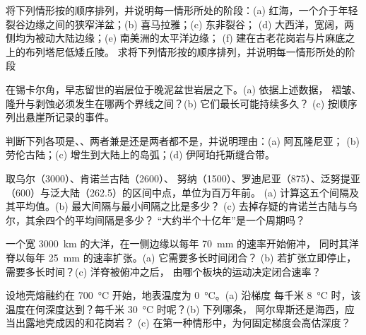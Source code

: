 \begin{exercise}[$\star$]\label{exo:b2:wilson-cycle:2}
将下列情形按的顺序排列，并说明每一情形所处的阶段：(a) 红海，一个介于年轻裂谷边缘之间的狭窄洋盆；(b) 喜马拉雅；(c) 东非裂谷；
(d) 大西洋，宽阔，两侧均为被动大陆边缘；(e) 南美洲的太平洋边缘；
(f) 建在古老花岗岩与片麻底之上的布列塔尼低矮丘陵。
求将下列情形按的顺序排列，并说明每一情形所处的阶段
\end{exercise}

\begin{exercise}[$\star$]\label{exo:b2:wilson-cycle:3}
在锡卡尔角，早志留世的岩层位于晚泥盆世岩层之下。(a) 依据上述数据，
褶皱、隆升与剥蚀必须发生在哪两个界线之间？(b) 它们最长可能持续多久？
(c) 按顺序列出悬崖所记录的事件。
\end{exercise}

\begin{exercise}[$\star$]\label{exo:b2:wilson-cycle:4}
判断下列各项是、、两者兼是还是两者都不是，并说明理由：(a) 阿瓦隆尼亚；
(b) 劳伦古陆；(c) 增生到大陆上的岛弧；(d) 伊阿珀托斯缝合带。
\end{exercise}

\begin{exercise}[$\star\star$]\label{exo:b2:wilson-cycle:5}
取乌尔（3000）、肯诺兰古陆（2600）、
努纳（1500）、罗迪尼亚（875）、泛努提亚（600）与泛大陆（262.5）的区间中点，单位为百万年前。
(a) 计算这五个间隔及其平均值。(b) 最大间隔与最小间隔之比是多少？
(c) 去掉存疑的肯诺兰古陆与乌尔，其余四个的平均间隔是多少？
“大约半个十亿年”是一个周期吗？
\end{exercise}

\begin{exercise}[$\star\star$]\label{exo:b2:wilson-cycle:6}
一个宽 \qty{3000}{km} 的大洋，在一侧边缘以每年 \qty{70}{mm} 的速率开始俯冲，
同时其洋脊以每年 \qty{25}{mm} 的速率扩张。(a) 它需要多长时间闭合？
(b) 若扩张立即停止，需要多长时间？(c) 洋脊被俯冲之后，
由哪个板块的运动决定闭合速率？
\end{exercise}

\begin{exercise}[$\star\star$]\label{exo:b2:wilson-cycle:7}
设地壳熔融约在 \qty{700}{\celsius} 开始，地表温度为
\qty{0}{\celsius}。(a) 沿梯度
每千米 \qty{8}{\celsius} 时，该温度在何深度达到？每千米 \qty{30}{\celsius} 时呢？(b) 下列哪条，
阿尔卑斯还是海西，应当出露地壳成因的和花岗岩？
(c) 在第一种情形中，为何固定梯度会高估深度？
\end{exercise}

